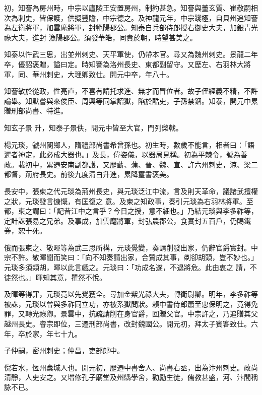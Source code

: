 \begin{pinyinscope}
 初，知謇為房州時，中宗以廬陵王安置房州，制約甚急。知謇與董玄質、崔敬嗣相次為刺史，皆保護，供擬豐贍，中宗德之。及神龍元年，中宗踐極，自貝州追知謇為左衛將軍，加雲麾將軍，封範陽郡公。知泰自兵部侍郎授右御史大夫，加銀青光祿大夫，進封
 漁陽郡公。須發華皓，同貴於朝，時望甚美之。



 知泰以忤武三思，出並州刺史、天平軍使，仍帶本官。尋又為魏州刺史。景龍二年卒，優詔褒贈，謚曰定。時知謇為洛州長史、東都副留守。又歷左、右羽林大將軍，同、華州刺史，大理卿致仕。開元中卒，年八十。



 知謇敏於從政，性亮直，不喜有請托求進、無才而冒位者。故子侄經義不精，不許論舉。知默嘗與來俊臣、周興等同掌詔獄，陷於酷吏，子孫禁錮。知泰，開元中累贈刑部尚書、特進。



 知玄子景
 升，知泰子景佚，開元中皆至大官，門列棨戟。



 楊元琰，虢州閿鄉人，隋禮部尚書希曾孫也。初生時，數歲不能言，相者曰：「語遲者神定，此必成大器也。」及長，偉姿儀，以器局見稱。初為平棘令，號為善政。載初中，累遷安南副都護，又歷蘄、蒲、晉、魏、宣、許六州刺史，涼、梁二都督，荊府長史。前後九度清白升進，累降璽書褒美。



 長安中，張柬之代元琰為荊州長史，與元琰泛江中流，言及則天革命，議諸武擅權之狀，元琰發言慷慨，有匡復之
 意。及柬之知政事，奏引元琰為右羽林將軍。至都，柬之謂曰：「記昔江中之言乎？今日之授，意不細也。」乃結元琰與李多祚等，定計誅張易之兄弟。及事成，加雲麾將軍，封弘農郡公，食實封五百戶，仍賜鐵券，恕十死。



 俄而張柬之、敬暉等為武三思所構，元琰覺變，奏請削發出家，仍辭官爵實封。中宗不許。敬暉聞而笑曰：「向不知奏請出家，合贊成其事，剃卻胡頭，豈不妙也。」元琰多須類胡，暉以此言戲之。元琰曰：「功成名遂，不退將危。此由衷之
 請，不徒然也。」暉知其意，瞿然不悅。



 及暉等得罪，元琰竟以先覺獲全。尋加金紫光祿大夫，轉衛尉卿。明年，李多祚等被誅，元琰以曾與多祚同立功，亦被系獄問狀。賴中書侍郎蕭至忠保明之，竟得免罪，又轉光祿卿。景雲中，抗疏請削在身官爵，回贈父官。中宗許之，乃追贈其父越州長史。睿宗即位，三遷刑部尚書，改封魏國公。開元初，拜太子賓客致仕。六年，卒於家，年七十九。



 子仲嗣，密州刺史；仲昌，吏部郎中。



 倪若水，恆州稾城人也。開元初，歷遷中書舍人、尚書右丞，出為汴州刺史。政尚清靜，人吏安之。又增修孔子廟堂及州縣學舍，勸勵生徒，儒教甚盛，河、汴間稱詠不已。




\end{pinyinscope}
